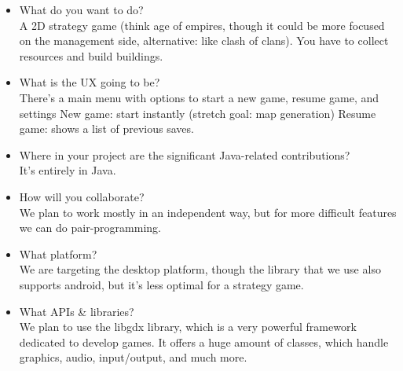 \documentclass{article}
\begin{document}
  \begin{itemize}
    \item What do you want to do?\\
    A 2D strategy game (think age of empires, though it could be more focused on the management side, alternative: like clash of clans). You have to collect resources and build buildings.

    \item What is the UX going to be?\\
    There's a main menu with options to start a new game, resume game, and settings
    New game: start instantly (stretch goal: map generation)
    Resume game: shows a list of previous saves.

    \item Where in your project are the significant Java-related contributions?\\
    It's entirely in Java.

    \item How will you collaborate?\\
    We plan to work mostly in an independent way, but for more difficult features we can do pair-programming.

    \item What platform?\\
    We are targeting the desktop platform, though the library that we use also supports android, but it's less optimal for a strategy game.

    \item What APIs \& libraries?\\
    We plan to use the libgdx library, which is a very powerful framework dedicated to develop games. It offers a huge amount of classes, which handle graphics, audio, input/output, and much more.
  \end{itemize}
\end{document}
